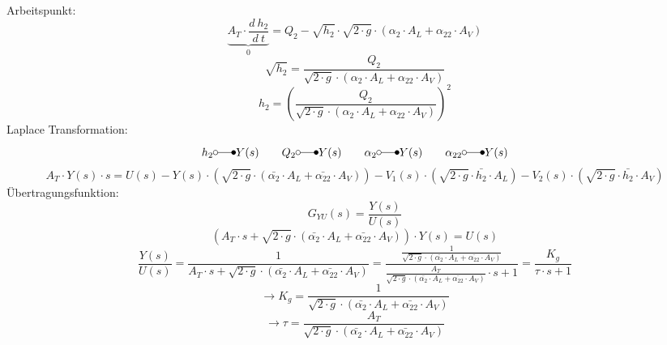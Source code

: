 Arbeitspunkt: 
\[
\underbrace{A_T \cdot \frac{d~h_2}{d~t}}_{0}
    = Q_2 - \sqrt{h_2} \cdot \sqrt{2 \cdot g} \cdot 
    (\alpha_2 \cdot A_L + \alpha_{22} \cdot A_V)
\]
\[
\sqrt{h_2}
    = \frac{Q_2}{\sqrt{2 \cdot g} \cdot 
    (\alpha_2 \cdot A_L + \alpha_{22} \cdot A_V)}
\]
\[
h_2
    = \left(\frac{Q_2}{\sqrt{2 \cdot g} \cdot 
    (\alpha_2 \cdot A_L + \alpha_{22} \cdot A_V)}\right)^2
\]
Laplace Transformation: 
\[ h_2          \laplace Y(s) \qquad
    Q_2          \laplace Y(s) \qquad
    \alpha_2     \laplace Y(s) \qquad
    \alpha_{22}  \laplace Y(s) \]
\[ A_T \cdot Y(s) \cdot s = U(s) 
    - Y(s)   \cdot \left(\sqrt{2 \cdot g} \cdot (\bar{\alpha_2} \cdot A_L + \bar{\alpha_{22}} \cdot A_V)\right)
    - V_1(s) \cdot \left(\sqrt{2 \cdot g} \cdot \bar{h_2} \cdot A_L\right)
    - V_2(s) \cdot \left(\sqrt{2 \cdot g} \cdot \bar{h_2} \cdot A_V\right)
\]
Übertragungsfunktion: 
\[ G_{YU}(s) = \frac{Y(s)}{U(s)} \]
\[ \left(A_T \cdot s 
    + \sqrt{2 \cdot g} \cdot (\bar{\alpha_2} \cdot A_L + \bar{\alpha_{22}} \cdot A_V)\right) \cdot Y(s) = U(s) 
\]
\[ \frac{Y(s)}{U(s)} 
    = \frac{1}{A_T \cdot s + 
    \sqrt{2 \cdot g} \cdot (\bar{\alpha_2} \cdot A_L + \bar{\alpha_{22}} \cdot A_V)}
    = \frac{\frac{1}{\sqrt{2 \cdot g} \cdot (\bar{\alpha_2} \cdot A_L + \bar{\alpha_{22}} \cdot A_V)}}
    {\frac{A_T}{\sqrt{2 \cdot g} \cdot (\bar{\alpha_2} \cdot A_L + \bar{\alpha_{22}} \cdot A_V)} \cdot s + 1}
    = \frac{K_g}{\tau \cdot s + 1}
\]
\[ \to K_g = \frac{1}{\sqrt{2 \cdot g} \cdot (\bar{\alpha_2} \cdot A_L + \bar{\alpha_{22}} \cdot A_V)} \]
\[ \to \tau = \frac{A_T}{\sqrt{2 \cdot g} \cdot (\bar{\alpha_2} \cdot A_L + \bar{\alpha_{22}} \cdot A_V)} \]
